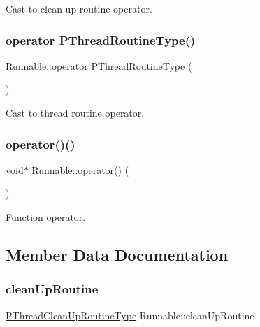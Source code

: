 Cast to clean-\/up routine operator. 

\mbox{\label{structRunnable_ad4a6cf9daf0f17048c0a8972e90d295d}} 
\subsubsection{\texorpdfstring{operator P\+Thread\+Routine\+Type()}{operator PThreadRoutineType()}}
{\footnotesize\ttfamily Runnable\+::operator \hyperlink{group__FUNC__DEFS_gaeef66643e734485d781ca826339879ea}{P\+Thread\+Routine\+Type} (\begin{DoxyParamCaption}{ }\end{DoxyParamCaption})\hspace{0.3cm}{\ttfamily [inline]}}



Cast to thread routine operator. 

\mbox{\label{structRunnable_a017eeb87c9076ffcb34338bba7fefb99}} 
\subsubsection{\texorpdfstring{operator()()}{operator()()}}
{\footnotesize\ttfamily void$\ast$ Runnable\+::operator() (\begin{DoxyParamCaption}{ }\end{DoxyParamCaption})\hspace{0.3cm}{\ttfamily [inline]}}



Function operator. 



\subsection{Member Data Documentation}
\mbox{\label{structRunnable_a62c14bef1f2acabcff9c126faf9c0218}} 
\subsubsection{\texorpdfstring{clean\+Up\+Routine}{cleanUpRoutine}}
{\footnotesize\ttfamily \hyperlink{group__FUNC__DEFS_ga77ca9e695666040451b77632df4847b9}{P\+Thread\+Clean\+Up\+Routine\+Type} Runnable\+::clean\+Up\+Routine}



